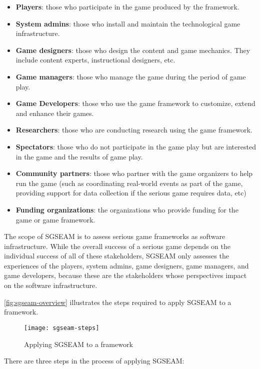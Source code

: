 \begin{itemize}
\item \textbf{Players}: those who participate in the game produced by the framework.
\item \textbf{System admins}: those who install and maintain the technological game infrastructure.
\item \textbf{Game designers}: those who design the content and game mechanics. They include  content experts, instructional designers, etc.
\item \textbf{Game managers}: those who manage the game during the period of game play.
\item \textbf{Game Developers}: those who use the game framework to customize, extend and enhance their games.
\item \textbf{Researchers}: those who are conducting research using the game framework.
\item \textbf{Spectators}: those who do not participate in the game play but are interested in the game and the results of game play. 
\item \textbf{Community partners}: those who partner with the game organizers to help run the game (such as coordinating real-world events as part of the game, providing support for data
  collection if the serious game requires data, etc) 
\item \textbf{Funding organizations}: the organizations who provide funding for the game or game framework.
\end{itemize}

The scope of SGSEAM is to assess serious game frameworks as software infrastructure. While
the overall success of a serious game depends on the individual success of all of these
stakeholders, SGSEAM only assesses the experiences of the players, system admins, game designers, game managers, and game developers, because these are the stakeholders whose perspectives impact on the software infrastructure. 

\autoref{fig:sgseam-overview} illustrates the steps required to apply SGSEAM to a framework.

\begin{figure}[ht!]
  \center
  \texttt{[image: sgseam-steps]}
  \caption{Applying SGSEAM to a framework}
  \label{fig:sgseam-overview}
\end{figure}

There are three steps in the process of applying SGSEAM:

